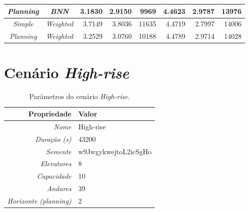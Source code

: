 \begin{table}[htb!]
\begin{tabular}{|c|c|r|r|r|r|r|r|}
\textit{Planning}    & \textit{BNN}             & 3.1830                              & 2.9150                               & 9969                                & \cellcolor[HTML]{67FD9A}4.4623                        & \cellcolor[HTML]{FFFFFF}2.9787                        & \cellcolor[HTML]{67FD9A}13976                        \\ \hline
\textit{Simple}      & \textit{Weighted}        & 3.7149                              & 3.8036                               & 11635                               & 4.4719                                                & \cellcolor[HTML]{67FD9A}2.7997                        & 14006                                                \\ \hline
\textit{Planning}    & \textit{Weighted}        & 3.2529                              & 3.0760                               & 10188                               & 4.4789                                                & 2.9714                                                & 14028                                                \\ \hline
\end{tabular}
\end{table}

\section{Cenário \textit{High-rise}}

\lipsum[1]

\begin{table}[htb!]
\centering
\caption{Parâmetros do cenário \textit{High-rise}.}
\label{tab:results:highrise:params}
\begin{tabular}{|r|l|}
\hline
\textbf{Propriedade}          & \textbf{Valor}       \\ \hline
\textit{Nome}                 & High-rise            \\ \hline
\textit{Duração (s)}          & 43200                \\ \hline
\textit{Semente}              & w9JwgykwejtoL2icSgHo \\ \hline
\textit{Elevatores}           & 8                    \\ \hline
\textit{Capacidade}           & 10                   \\ \hline
\textit{Andares}              & 39                   \\ \hline
\textit{Horizonte (planning)} & 2                    \\ \hline
\end{tabular}
\end{table}

